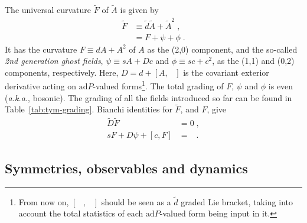 \documentclass[../main/tex]{subfiles}
\begin{document}
The universal curvature $ \tilde{F} $ of $\tilde{A}$ is given by
\begin{subequations}\label{eq:universal-curvature}
  \begin{align}
    \tilde{F} & \equiv \tilde{d}\tilde{A}+\tilde{A}^2\;, \\
              & = F+\psi+\phi \;.
  \end{align}
\end{subequations}
It has the curvature $F\equiv dA+A^2$ of $A$ as the (2,0) component, and the so-called \emph{2nd generation ghost fields}, $\psi \equiv sA + Dc$ and $\phi \equiv sc + c^2$, as the (1,1) and (0,2) components, respectively. Here, $D=d+ \left[ A, \phantom{A} \right]$ is the covariant exterior derivative acting on $\mathrm{ad}P$-valued forms\footnote{From now on, $\left[ \phantom{ A }, \phantom{ A } \right]$ should be seen as a $\tilde{d}$ graded Lie bracket, taking into account the total statistics of each $\mathrm{ad}P$-valued form being input in it.}. The total grading of $F$, $\psi$ and $\phi$ is even (\textit{a.k.a.}, bosonic). The grading of all the fields introduced so far can be found in Table~\ref{tab:tym-grading}. Bianchi identities for $\tilde{F}$, and $F$, give
\begin{subequations}\label{eq:universal-bianchi-identity}
  \begin{align}
    \tilde{D}\tilde{F}          & =0 \;,            \\
    sF+D\psi+\left[ c,F \right] & =\phantom{ 0 }\;.
  \end{align}
\end{subequations}

\subsection{Symmetries, observables and dynamics}\label{ssec:sym-and-obs;sec:tym}
\end{document}

